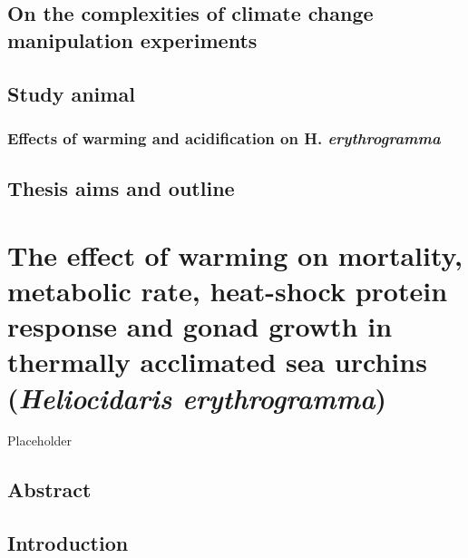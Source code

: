 \documentclass[
  oneside, 11pt, a4paper]{memoir}
\begin{document}
\hypertarget{on-the-complexities-of-climate-change-manipulation-experiments}{%
\section{On the complexities of climate change manipulation experiments}\label{on-the-complexities-of-climate-change-manipulation-experiments}}

\hypertarget{study-animal}{%
\section{Study animal}\label{study-animal}}

\hypertarget{effects-of-warming-and-acidification-on-h.-erythrogramma}{%
\subsection{\texorpdfstring{Effects of warming and acidification on H. \emph{erythrogramma}}{Effects of warming and acidification on H. erythrogramma}}\label{effects-of-warming-and-acidification-on-h.-erythrogramma}}

\hypertarget{thesis-aims-and-outline}{%
\section{Thesis aims and outline}\label{thesis-aims-and-outline}}

\hypertarget{chapter2}{%
\chapter{\texorpdfstring{The effect of warming on mortality, metabolic rate, heat-shock protein response and gonad growth in thermally acclimated sea urchins (\emph{Heliocidaris erythrogramma})}{The effect of warming on mortality, metabolic rate, heat-shock protein response and gonad growth in thermally acclimated sea urchins (Heliocidaris erythrogramma)}}\label{chapter2}}

Placeholder

\hypertarget{abstract}{%
\section*{Abstract}\label{abstract}}

\hypertarget{introduction}{%
\section{Introduction}\label{introduction}}
\end{document}
